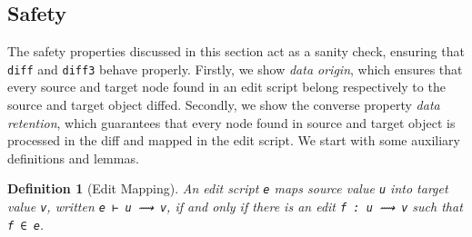 \documentclass[preprint]{sigplanconf}
\theoremstyle{plain}
\newtheorem{definition}{Definition}
\begin{document}
    \subsection{Safety}
    The safety properties discussed in this section act as a sanity
    check, ensuring that \texttt{diff} and \texttt{diff3} behave
    properly.
    Firstly, we show \emph{data origin}, which ensures that every source
    and target node found in an edit script belong respectively to the
    source and target object diffed.  
    Secondly, we show the converse property \emph{data retention}, which 
    guarantees that every node found in source and target object is
    processed in the diff and mapped in the edit script.
    We start with some auxiliary definitions and lemmas.




\begin{definition}[Edit Mapping]
An edit script \texttt{e} maps source value \texttt{u} into
target value \texttt{v}, written \texttt{e ⊢ u ⟿ v}, if and
only if there is an edit \texttt{f : u ⟿ v} such that \texttt{f ∈ e}.
\end{definition}

\end{document}
